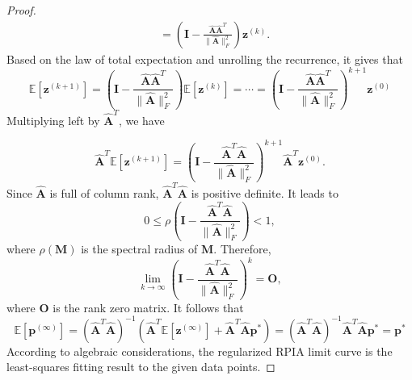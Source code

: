 \documentclass[11pt]{article}
\numberwithin{equation}{section}
\begin{document}
\begin{proof}
$$\begin{aligned}
& =\left(\boldsymbol{I}-\frac{\hat{\boldsymbol{A}} \hat{\boldsymbol{A}}^T}{\|\hat{\boldsymbol{A}}\|_F^2}\right) \boldsymbol{z}^{(k)} .
\end{aligned}
$$
Based on the law of total expectation and unrolling the recurrence, it gives that
$$
\mathbb{E}\left[\boldsymbol{z}^{(k+1)}\right]=\left(\boldsymbol{I}-\frac{\hat{\boldsymbol{A}} \hat{\boldsymbol{A}}^{T}}{\|\hat{\boldsymbol{A}}\|_{F}^{2}}\right) \mathbb{E}\left[\boldsymbol{z}^{(k)}\right]=\cdots=\left(\boldsymbol{I}-\frac{\hat{\boldsymbol{A}} \hat{\boldsymbol{A}}^{T}}{\|\hat{\boldsymbol{A}}\|_{F}^{2}}\right)^{k+1} \boldsymbol{z}^{(0)}
$$
Multiplying left by $\hat{\boldsymbol{A}}^{T}$, we have

$$
\hat{\boldsymbol{A}}^{T} \mathbb{E}\left[\boldsymbol{z}^{(k+1)}\right]=\left(\boldsymbol{I}-\frac{\hat{\boldsymbol{A}}^{T} \hat{\boldsymbol{A}}}{\|\hat{\boldsymbol{A}}\|_{F}^{2}}\right)^{k+1} \hat{\boldsymbol{A}}^{T} \boldsymbol{z}^{(0)}.
$$
Since $\hat{\boldsymbol{A}}$ is full of column rank, $\hat{\boldsymbol{A}}^{T} \hat{\boldsymbol{A}}$ is positive definite. It leads to
$$
0 \leq \rho\left(\boldsymbol{I}-\frac{\hat{\boldsymbol{A}}^{T} \hat{\boldsymbol{A}}}{\|\hat{\boldsymbol{A}}\|_{F}^{2}}\right)<1,
$$
where $\rho(\boldsymbol{M})$ is the spectral radius of $\boldsymbol{M}$. Therefore,
$$
\lim _{k \rightarrow \infty}\left(\boldsymbol{I}-\frac{\hat{\boldsymbol{A}}^{T} \hat{\boldsymbol{A}}}{\|\hat{\boldsymbol{A}}\|_{F}^{2}}\right)^{k}=\boldsymbol{O},
$$
where $\boldsymbol{O}$ is the rank zero matrix. It follows that
$$
\mathbb{E}\left[\boldsymbol{p}^{(\infty)}\right]=\left(\hat{\boldsymbol{A}}^{T} \hat{\boldsymbol{A}}\right)^{-1}\left(\hat{\boldsymbol{A}}^{T} \mathbb{E}\left[\boldsymbol{z}^{(\infty)}\right]+\hat{\boldsymbol{A}}^{T} \hat{\boldsymbol{A}} \boldsymbol{p}^{*}\right)=\left(\hat{\boldsymbol{A}}^{T} \hat{\boldsymbol{A}}\right)^{-1} \hat{\boldsymbol{A}}^{T} \hat{\boldsymbol{A}} \boldsymbol{p}^{*}=\boldsymbol{p}^{*}
$$
According to algebraic considerations, the regularized RPIA limit curve is the least-squares fitting result to the given data points.
\end{proof}
\end{document}
